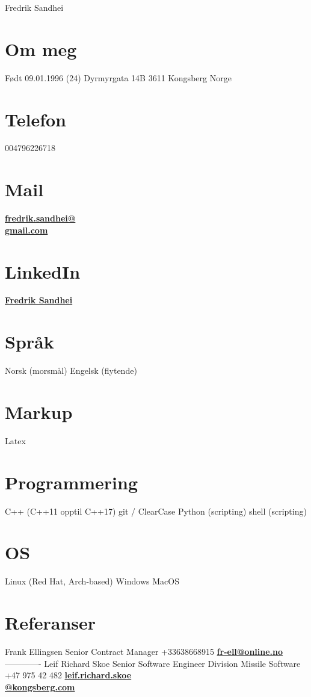 \documentclass[]{friggeri-cv}
\begin{document}
       {Fredrik Sandhei}

\begin{aside}
  \section{Om meg}
    Født 09.01.1996 (24)
    Dyrmyrgata 14B 
    3611 Kongsberg
    Norge
  \section{Telefon}
    004796226718
  \section{Mail}
    \href{mailto:fredrik.sandhei@gmail.com}{\textbf{fredrik.sandhei@\\gmail.com}}   
  \section{LinkedIn}
  	\href{https://www.linkedin.com/in/fredrik-sandhei-7738b617a/}{\textbf{Fredrik Sandhei}}
  \section{Språk}
    Norsk (morsmål)
    Engelsk (flytende)
  \section{Markup}
  	Latex
  \section{Programmering}
    C++ (C++11 opptil C++17)
    git / ClearCase 
    Python (scripting)
    shell (scripting)
  \section{OS}
  	Linux (Red Hat, Arch-based)
  	Windows
  	MacOS
  \section{Referanser}
    Frank Ellingsen
    Senior Contract Manager
    +33\hspace{0.1cm}638668915
    \href{mailto:fr-ell@online.no}{\textbf{fr-ell@online.no}}
    -------------
    Leif Richard Skoe
    Senior Software Engineer
    Division Missile Software
    +47 975 42 482
	    \href{mailto:leif.richard.skoe@kongsberg.com}{\textbf{leif.richard.skoe\\@kongsberg.com}}	
\end{aside}
\end{document}
